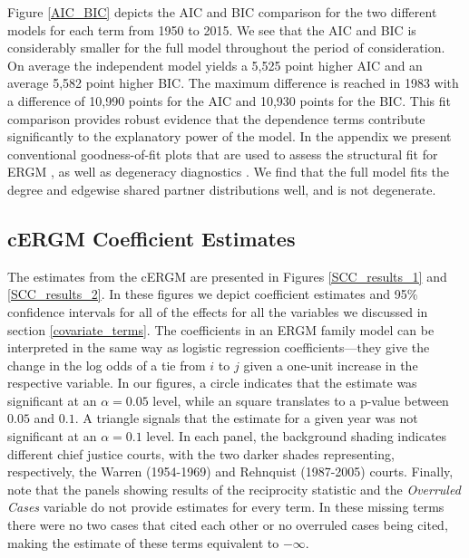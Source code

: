 \documentclass[headsepline=true, abstracton]{scrartcl}
\begin{document}
Figure \ref{AIC_BIC} depicts the AIC and BIC comparison for the two different models for each term from 1950 to 2015. We see that the AIC and BIC is considerably smaller for the full model throughout the period of consideration. On average the independent model yields a 5,525 point higher AIC and an average 5,582 point higher BIC. The maximum difference is reached in 1983 with a difference of 10,990 points for the AIC and 10,930 points for the BIC. This fit comparison provides robust evidence that the dependence terms contribute significantly to the explanatory power of the model. In the appendix we present conventional goodness-of-fit plots that are used to assess the structural fit for ERGM \citep{hunter2008goodness}, as well as degeneracy diagnostics \citep{mukherjee2020degeneracy}. We find that the full model fits the degree and edgewise shared partner distributions well, and is not degenerate.

\subsection{cERGM Coefficient Estimates}
The estimates from the cERGM are presented in Figures \ref{SCC_results_1} and \ref{SCC_results_2}. In these figures we depict coefficient estimates and 95\% confidence intervals for all of the effects for all the variables we discussed in section \ref{covariate_terms}. The coefficients in an ERGM family model can be interpreted in the same way as logistic regression coefficients---they give the change in the log odds of a tie from $i$ to $j$ given a one-unit increase in the respective variable. In our figures, a circle indicates that the estimate was significant at an $\alpha=0.05$ level, while an square translates to a p-value between $0.05$ and $0.1$. A triangle signals that the estimate for a given year was not significant at an $\alpha=0.1$ level. In each panel, the background shading indicates different chief justice courts, with the two darker shades representing, respectively, the Warren (1954-1969) and Rehnquist (1987-2005) courts. Finally, note that the panels showing results of the reciprocity statistic and the \textit{Overruled Cases} variable do not provide estimates for every term. In these missing terms there were no two cases that cited each other or no overruled cases being cited, making the estimate of these terms equivalent to $-\infty$. %
\end{document}
